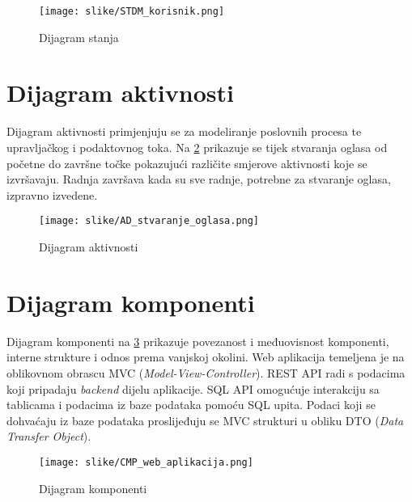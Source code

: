				\begin{figure}[H]
					\texttt{[image: slike/STDM\_korisnik.png]}
					\centering
					\caption{Dijagram stanja}
					\label{fig:dig_stanja}
				\end{figure}
			
			
			\eject 
		
		\section{Dijagram aktivnosti}
			
%			

			Dijagram aktivnosti primjenjuju se za modeliranje poslovnih procesa te upravljačkog i podaktovnog toka. Na \ref{fig:dig_aktivnosti} prikazuje se tijek stvaranja oglasa od početne do završne točke pokazujući različite smjerove aktivnosti koje se izvršavaju. Radnja završava kada su sve radnje, potrebne za stvaranje oglasa, izpravno izvedene.

				\begin{figure}[H]
					\texttt{[image: slike/AD\_stvaranje\_oglasa.png]}
					\centering
					\caption{Dijagram aktivnosti}
					\label{fig:dig_aktivnosti}
				\end{figure}
			
			\eject
		\section{Dijagram komponenti}
		
%		

			Dijagram komponenti na \ref{fig:dig_komponenti} prikazuje povezanost i međuovisnost komponenti, interne strukture i odnos prema vanjskoj okolini. Web aplikacija temeljena je na oblikovnom obrascu MVC (\textit{Model-View-Controller}). REST API radi s podacima koji pripadaju \textit{backend} dijelu aplikacije. SQL API omogućuje interakciju sa tablicama i podacima iz baze podataka pomoću SQL upita. Podaci koji se dohvaćaju iz baze podataka proslijeđuju se MVC strukturi u obliku DTO (\textit{Data Transfer Object}).

				\begin{figure}[H]
					\texttt{[image: slike/CMP\_web\_aplikacija.png]}
					\centering
					\caption{Dijagram komponenti}
					\label{fig:dig_komponenti}
				\end{figure}
				
			\eject

			